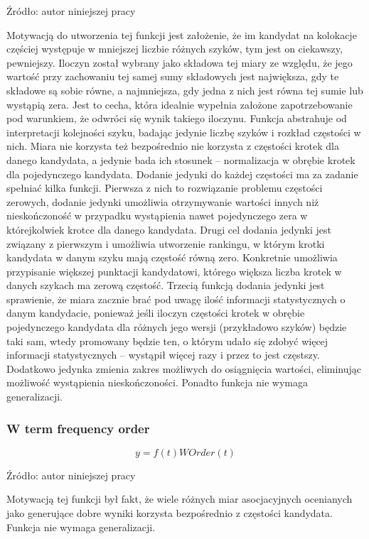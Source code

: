 Źródło: autor niniejszej pracy

\par
Motywacją do utworzenia tej funkcji jest założenie, że im kandydat na kolokacje częściej występuje w mniejszej liczbie różnych szyków, tym jest on ciekawszy, pewniejszy.
Iloczyn został wybrany jako składowa tej miary ze względu, że jego wartość przy zachowaniu tej samej sumy składowych jest największa, gdy te składowe są sobie równe, a najmniejsza, gdy jedna z nich jest równa tej sumie lub wystąpią zera.
Jest to cecha, która idealnie wypełnia założone zapotrzebowanie pod warunkiem, że odwróci się wynik takiego iloczynu.
Funkcja abstrahuje od interpretacji kolejności szyku, badając jedynie liczbę szyków i rozkład częstości w nich.
Miara nie korzysta też bezpośrednio nie korzysta z częstości krotek dla danego kandydata, a jedynie bada ich stosunek -- normalizacja w obrębie krotek dla pojedynczego kandydata.
Dodanie jedynki do każdej częstości ma za zadanie spełniać kilka funkcji.
Pierwsza z nich to rozwiązanie problemu częstości zerowych, dodanie jedynki umożliwia otrzymywanie wartości innych niż nieskończoność w przypadku wystąpienia nawet pojedynczego zera w którejkolwiek krotce dla danego kandydata.
Drugi cel dodania jedynki jest związany z pierwszym i umożliwia utworzenie rankingu, w którym krotki kandydata w danym szyku mają częstość równą zero.
Konkretnie umożliwia przypisanie większej punktacji kandydatowi, którego większa liczba krotek w danych szykach ma zerową częstość.
Trzecią funkcją dodania jedynki jest sprawienie, że miara zacznie brać pod uwagę ilość informacji statystycznych o danym kandydacie, ponieważ jeśli iloczyn częstości krotek w obrębie pojedynczego kandydata dla różnych jego wersji (przykładowo szyków) będzie taki sam, wtedy promowany będzie ten, o którym udało się zdobyć więcej informacji statystycznych -- wystąpił więcej razy i przez to jest częstszy.
Dodatkowo jedynka zmienia zakres możliwych do osiągnięcia wartości, eliminując możliwość wystąpienia nieskończoności.
Ponadto funkcja nie wymaga generalizacji.


\subsubsection{W term frequency order}
$$ y = f(t) WOrder(t) $$

Źródło: autor niniejszej pracy

\par
Motywacją tej funkcji był fakt, że wiele różnych miar asocjacyjnych ocenianych jako generujące dobre wyniki korzysta bezpośrednio z częstości kandydata.
Funkcja nie wymaga generalizacji.

